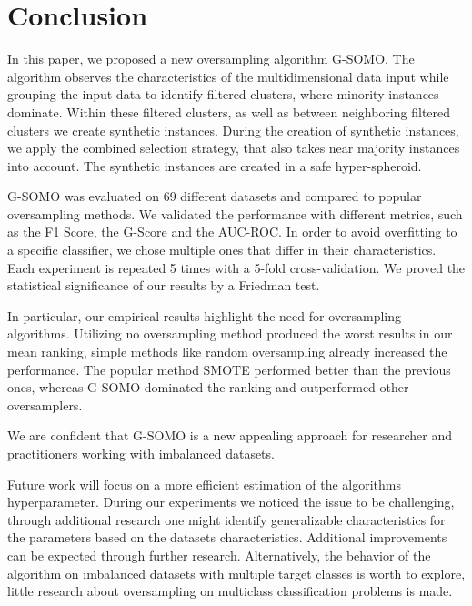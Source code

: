 \documentclass[parskip=full]{scrartcl}
\begin{document}
\section{Conclusion}

In this paper, we proposed a new oversampling algorithm G-SOMO. The algorithm observes the characteristics
 of the multidimensional data input while grouping the input data to identify filtered clusters, where 
 minority instances dominate. Within these filtered clusters, as well as between neighboring filtered 
 clusters we create synthetic instances. During the creation of synthetic instances, we apply the combined 
 selection strategy, that also takes near majority instances into account. The synthetic instances are 
 created in a safe hyper-spheroid. 

G-SOMO was evaluated on 69 different datasets and compared to popular oversampling methods. We validated 
the performance with different metrics, such as the F1 Score, the G-Score and the AUC-ROC. In order to 
avoid overfitting to a specific classifier, we chose multiple ones that differ in their characteristics. 
Each experiment is repeated 5 times with a 5-fold cross-validation. We proved the statistical significance 
of our results by a Friedman test.

In particular, our empirical results highlight the need for oversampling algorithms. Utilizing no oversampling 
method produced the worst results in our mean ranking, simple methods like random oversampling already 
increased the performance. The popular method SMOTE performed better than the previous ones, whereas G-SOMO 
dominated the ranking and outperformed other oversamplers. 

We are confident that G-SOMO is a new appealing approach for researcher and practitioners working with 
imbalanced datasets. 

Future work will focus on a more efficient estimation of the algorithms hyperparameter. During our experiments 
we noticed the issue to be challenging, through additional research one might identify generalizable 
characteristics for the parameters based on the datasets characteristics. Additional improvements can be 
expected through further research. Alternatively, the behavior of the algorithm on imbalanced datasets with 
multiple target classes is worth to explore, little research about oversampling on multiclass classification 
problems is made. 



\end{document}
